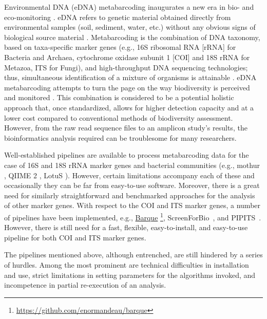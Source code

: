    Environmental DNA (eDNA) metabarcoding inaugurates a new era in bio- and eco-monitoring \citep{pavan2015dna}. 
   eDNA refers to genetic material obtained directly from environmental samples (soil, sediment, water, etc.) without any obvious signs of biological source material \citep{thomsen2015environmental}. 
   Metabarcoding is the combination of DNA taxonomy, based on taxa-specific marker genes (e.g., 16S ribosomal RNA [rRNA] for Bacteria and Archaea, cytochrome oxidase subunit 1 [COI] and 18S rRNA for Metazoa, ITS for Fungi), and high-throughput DNA sequencing technologies; thus, simultaneous identification of a mixture of organisms is attainable \citep{ji2013reliable}. 
   eDNA metabarcoding attempts to turn the page on the way biodiversity is perceived and monitored \citep{ji2013reliable}. 
   This combination is considered to be a potential holistic approach that, once standardized, allows for higher detection capacity and at a lower cost compared to conventional methods of biodiversity assessment. 
   However, from the raw read sequence files to an amplicon study's results, the bioinformatics analysis required can be troublesome for many researchers.

   Well-established pipelines are available to process metabarcoding data for the case of 16S and 18S rRNA marker genes and bacterial communities (e.g., mothur \citep{schloss2009introducing}, QIIME 2 \citep{bolyen2018qiime}, LotuS \citep{hildebrand2014lotus}). 
   However, certain limitations accompany each of these and occasionally they can be far from easy-to-use software. Moreover, there is a great need for similarly straightforward and benchmarked approaches for the analysis of other marker genes. With respect to the COI and ITS marker genes, a number of pipelines have been implemented, e.g., 
   \href{https://github.com/enormandeau/barque}{Barque} 
   \footnote{
      \href{https://github.com/enormandeau/barque}{https://github.com/enormandeau/barque}
   }, 
   ScreenForBio~\citep{axtner2019efficient}, and PIPITS~\citep{gweon2015pipits}. 
   However, there is still need for a fast, flexible, easy-to-install, and easy-to-use pipeline for both COI and ITS marker genes.
   
   The pipelines mentioned above, although entrenched, are still hindered by a series of hurdles. 
   Among the most prominent are technical difficulties in installation and use, strict limitations in setting parameters for the algorithms invoked, and incompetence in partial re-execution of an analysis.
   
